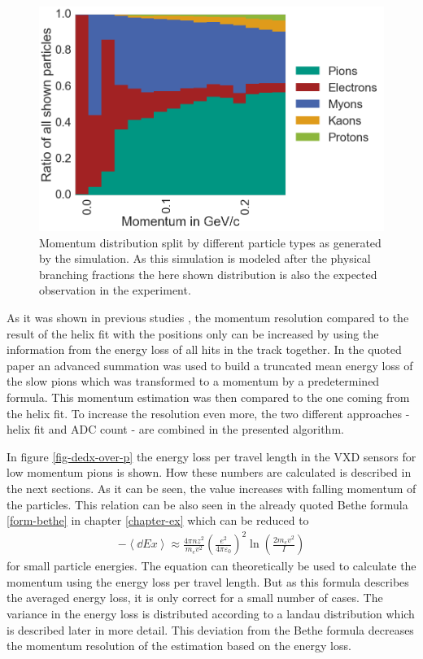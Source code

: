 \begin{figure}
 \centering
 \includegraphics[width=0.8\linewidth]{figures/vxd/momentumDistribution.png}
 \caption[Momentum distribution by different particle types.]{Momentum distribution split by different particle types as generated by the simulation. As this simulation is modeled after the physical branching fractions the here shown distribution is also the expected observation in the experiment.}
 \label{fig-particles-momentum}
\end{figure}

As it was shown in previous studies \cite{robert}, the momentum resolution compared to the result of the helix fit with the positions only can be increased by using the information from the energy loss of all hits in the track together. In the quoted paper an advanced summation was used to build a truncated mean energy loss of the slow pions which was transformed to a momentum by a predetermined formula. This momentum estimation was then compared to the one coming from the helix fit. To increase the resolution even more, the two different approaches - helix fit and ADC count - are combined in the presented algorithm.

In figure \ref{fig-dedx-over-p} the energy loss per travel length in the VXD sensors for low momentum pions is shown. How these numbers are calculated is described in the next sections. As it can be seen, the \dedx value increases with falling momentum of the particles. This relation can be also seen in the already quoted Bethe formula \ref{form-bethe} in chapter \ref{chapter-ex} which can be reduced to 
\begin{align}
 -\left \langle \dd{E}{x} \right\rangle \approx \frac{4 \pi n z^2}{m_e v^2} \left( \frac{e^2}{4 \pi \varepsilon_0} \right)^2 \ln \left( \frac{2 m_e v^2}{I} \right) \label{form-bethe-simpl}
\end{align}
for small particle energies. The equation can theoretically be used to calculate the momentum using the energy loss per travel length. But as this formula describes the averaged energy loss, it is only correct for a small number of cases. The variance in the energy loss is distributed according to a landau distribution which is described later in more detail. This deviation from the Bethe formula decreases the momentum resolution of the estimation based on the energy loss.

